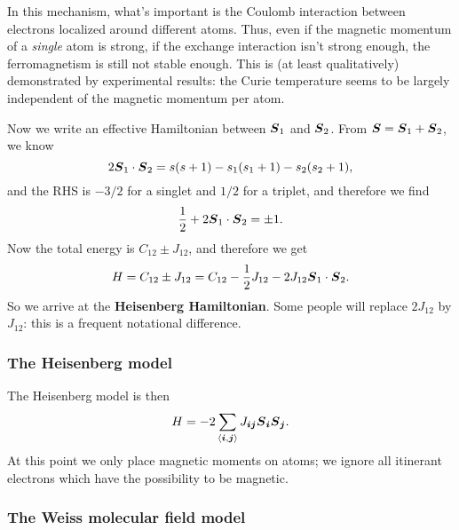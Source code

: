 \documentclass[hyperref, a4paper]{article}
\newcommand*{\pair}[1]{\langle #1 \rangle}
\newcommand*{\concept}[1]{{\textbf{#1}}}
\begin{document}
In this mechanism, 
what's important is the Coulomb interaction between electrons localized around different atoms.
Thus, even if the magnetic momentum of a \emph{single} atom is strong,
if the exchange interaction isn't strong enough,
the ferromagnetism is still not stable enough.
This is (at least qualitatively) demonstrated by experimental results:
the Curie temperature seems to be largely 
independent of the magnetic momentum per atom.

Now we write an effective Hamiltonian between $\vb*{S}_1$ and $\vb*{S}_2$.
From $\vb*{S} = \vb*{S}_1 + \vb*{S}_2$, we know 
\begin{equation}
    2 \vb*{S}_1 \cdot \vb*{S}_2 = 
    s(s+1) - s_1 (s_1 + 1) - s_2 (s_2 + 1),
\end{equation}
and the RHS is $-3/2$ for a singlet and $1/2$ for a triplet,
and therefore we find 
\[
    \frac{1}{2} + 2 \vb*{S}_1 \cdot \vb*{S}_2 = \pm 1.
\]
Now the total energy is $C_{12} \pm J_{12}$,
and therefore we get 
\begin{equation}
    H = C_{12} \pm J_{12} 
    = C_{12} - \frac{1}{2} J_{12} - 2 J_{12} \vb*{S}_1 \cdot \vb*{S}_2.
\end{equation}
So we arrive at the \concept{Heisenberg Hamiltonian}.
Some people will replace $2 J_{12}$ by $J_{12}$:
this is a frequent notational difference.

\subsubsection{The Heisenberg model}

The Heisenberg model is then 
\begin{equation}
    H = - 2 \sum_{\pair{\vb*{i}, \vb*{j}}} J_{\vb*{i} \vb*{j}} \vb*{S}_{\vb*{i}} \vb*{S}_{\vb*{j}}.
    \label{eq:heisenberg}
\end{equation}
At this point we only place magnetic moments on atoms; 
we ignore all itinerant electrons which have the possibility to be magnetic.

\subsubsection{The Weiss molecular field model}
\end{document}
